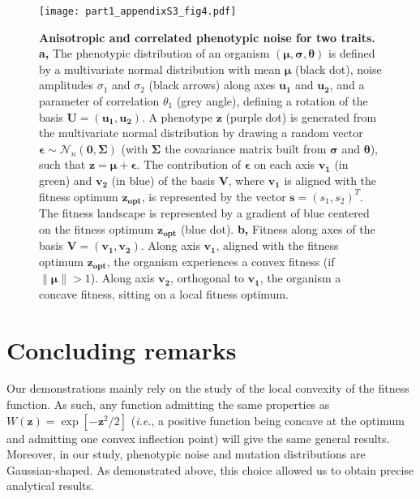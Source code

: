 \begin{figure}[!h]
\begin{adjustwidth}{-0.4in}{0in}
\centering
\texttt{[image: part1\_appendixS3\_fig4.pdf]}
\end{adjustwidth}
\caption[Anisotropic and correlated phenotypic noise for two traits.]{\textbf{Anisotropic and correlated phenotypic noise for two traits.}
\textbf{a,} The phenotypic distribution of an organism $(\boldsymbol{\mu}, \boldsymbol{\sigma}, \boldsymbol{\theta})$ is defined by a multivariate normal distribution with mean $\boldsymbol{\mu}$ (black dot), noise amplitudes $\sigma_1$ and $\sigma_2$ (black arrows) along axes $\boldsymbol{u_1}$ and $\boldsymbol{u_2}$, and a parameter of correlation $\theta_1$ (grey angle), defining a rotation of the basis $\boldsymbol{U} = (\boldsymbol{u_1}, \boldsymbol{u_2})$. A phenotype $\boldsymbol{z}$ (purple dot) is generated from the multivariate normal distribution by drawing a random vector $\boldsymbol{\epsilon} \sim \mathcal{N}_n(\boldsymbol{0},\boldsymbol{\Sigma})$ (with $\boldsymbol{\Sigma}$ the covariance matrix built from $\boldsymbol{\sigma}$ and $\boldsymbol{\theta}$), such that $\boldsymbol{z} = \boldsymbol{\mu} + \boldsymbol{\epsilon}$. The contribution of $\boldsymbol{\epsilon}$ on each axis $\boldsymbol{v_1}$ (in green) and $\boldsymbol{v_2}$ (in blue) of the basis $\boldsymbol{V}$, where $\boldsymbol{v_1}$ is aligned with the fitness optimum $\boldsymbol{z_{opt}}$, is represented by the vector $\boldsymbol{s} = (s_1, s_2)^T$. The fitness landscape is represented by a gradient of blue centered on the fitness optimum $\boldsymbol{z_{opt}}$ (blue dot).
\textbf{b,} Fitness along axes of the basis $\boldsymbol{V} = (\boldsymbol{v_1}, \boldsymbol{v_2})$. Along axis $\boldsymbol{v_1}$, aligned with the fitness optimum $\boldsymbol{z_{opt}}$, the organism experiences a convex fitness (if $\lVert \boldsymbol{\mu} \rVert > 1$). Along axis $\boldsymbol{v_2}$, orthogonal to $\boldsymbol{v_1}$, the organism a concave fitness, sitting on a local fitness optimum.
}
\label{part1:appendixS3:fig4}
\end{figure}


\section*{Concluding remarks}

Our demonstrations mainly rely on the study of the local convexity of the fitness function. As such, any function admitting the same properties as $W(\boldsymbol{z})=\exp\left[-\boldsymbol{z}^2/2\right]$ (\textit{i.e.}, a positive function being concave at the optimum and admitting one convex inflection point) will give the same general results. Moreover, in our study, phenotypic noise and mutation distributions are Gaussian-shaped. As demonstrated above, this choice allowed us to obtain precise analytical results.

